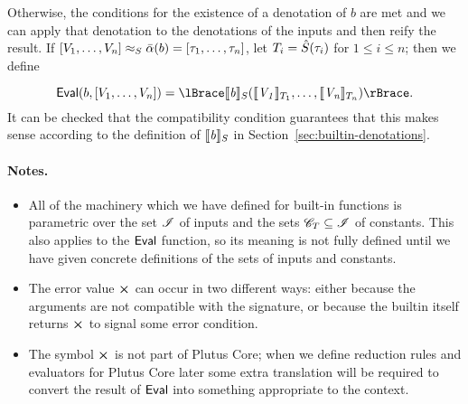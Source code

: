 \noindent Otherwise, the conditions for the existence of a denotation of $b$ are
met and we can apply that denotation to the denotations of the inputs and then
reify the result. If $[V_1, \ldots, V_n] \approx_S \bar{\alpha}(b) = [\tau_1,
  \ldots, \tau_n]$, let $T_i = \hat{S}(\tau_i)$ for $1 \leq i \leq n$; then we
define

$$
\Eval(b,[V_1, \ldots, V_n]) = \reify{\denote{b}_S (\denote{V_1}_{T_1}, \ldots, \denote{V_n}_{T_n})}.
$$%
%
%
\noindent It can be checked that the compatibility condition guarantees that
this makes sense according to the definition of $\llbracket\mathit{b}\rrbracket_S$ in
Section~\ref{sec:builtin-denotations}.

\paragraph{Notes.}
\begin{itemize}
  \item All of the machinery which we have defined for built-in functions is
    parametric over the set $\mathscr{I}$ of inputs and the sets $\mathscr{C}_{T} \subseteq
    \mathscr{I}$ of constants. This also applies to the $\mathsf{Eval}$ function, so its
    meaning is not fully defined until we have given concrete definitions of the
    sets of inputs and constants.
  \item The error value $\errorX$ can occur in two different ways: either
    because the arguments are not compatible with the signature, or because the
    builtin itself returns $\errorX$ to signal some error condition.
\item The symbol $\errorX$ is not part of Plutus Core; when we define reduction
  rules and evaluators for Plutus Core later some extra translation will be
  required to convert the result of $\mathsf{Eval}$ into something appropriate to the
  context.
\end{itemize}


